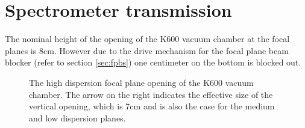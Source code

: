 \documentclass[11pt]{report}
\begin{document}








\section{Spectrometer transmission}\label{sec:Spectrometer_transmission}


The nominal height of the opening of the K600 vacuum chamber at the focal planes
is 8cm. However due to the drive mechanism for the focal plane beam blocker
(refer to section \ref{sec:fpbs}) one centimeter on the bottom is blocked out.
\begin{figure}
\centerline{\vspace{0cm}\hspace{0cm}
}
\centering
\caption{The high dispersion focal plane opening of the K600 vacuum chamber. 
The arrow on the right indicates the effective size of the vertical opening, which is 7cm 
and is also the case for the medium and low dispersion planes.}
\label{fig:highdispexit}
\end{figure} 
\bigskip
\end{document}
